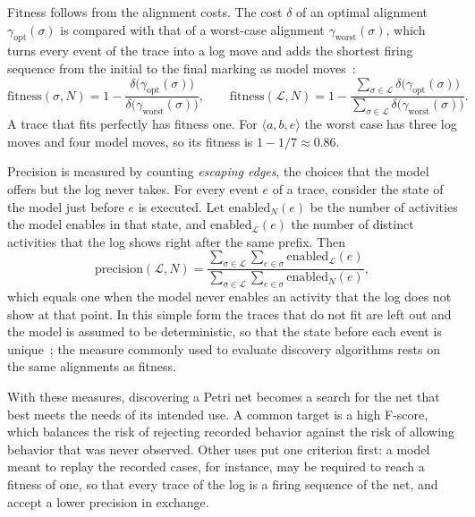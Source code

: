     Fitness follows from the alignment costs. The cost $\delta$ of an optimal
    alignment $\gamma_{\mathrm{opt}}(\sigma)$ is compared with that of a
    worst-case alignment $\gamma_{\mathrm{worst}}(\sigma)$, which turns every event
    of the trace into a log move and adds the shortest firing sequence from the
    initial to the final marking as model moves~\cite{vanderaalst2016}:
    \begin{equation}
    \mathrm{fitness}(\sigma, N) =
    1 - \frac{\delta\bigl(\gamma_{\mathrm{opt}}(\sigma)\bigr)}
             {\delta\bigl(\gamma_{\mathrm{worst}}(\sigma)\bigr)},
    \qquad
    \mathrm{fitness}(\mathcal{L}, N) =
    1 - \frac{\sum_{\sigma \in \mathcal{L}} \delta\bigl(\gamma_{\mathrm{opt}}(\sigma)\bigr)}
             {\sum_{\sigma \in \mathcal{L}} \delta\bigl(\gamma_{\mathrm{worst}}(\sigma)\bigr)}.
    \label{eq:bg:sim:fitness}
    \end{equation}
    A trace that fits perfectly has fitness one. For
    $\langle a, b, e \rangle$ the worst case has three log moves and four model
    moves, so its fitness is $1 - 1/7 \approx 0.86$.
    
    Precision is measured by counting \emph{escaping edges}, the choices that the
    model offers but the log never takes. For every
    event $e$ of a trace, consider the state of the model just before $e$ is
    executed. Let $\mathrm{enabled}_N(e)$ be the number of activities the model
    enables in that state, and $\mathrm{enabled}_{\mathcal{L}}(e)$ the number of
    distinct activities that the log shows right after the same prefix. Then
    \begin{equation}
    \mathrm{precision}(\mathcal{L}, N) =
    \frac{\sum_{\sigma \in \mathcal{L}} \sum_{e \in \sigma} \mathrm{enabled}_{\mathcal{L}}(e)}
         {\sum_{\sigma \in \mathcal{L}} \sum_{e \in \sigma} \mathrm{enabled}_N(e)},
    \label{eq:bg:sim:precision}
    \end{equation}
    which equals one when the model never enables an activity that the log does
    not show at that point. In this simple form the traces that do not fit are
    left out and the model is assumed to be deterministic, so that the state
    before each event is unique~\cite{carmona2022conformance}; the measure
    commonly used to evaluate discovery algorithms rests on the same alignments
    as fitness.

    With these measures, discovering a Petri net becomes a search for the
    net that best meets the needs of its intended use. A common target is a
    high F-score, which balances the risk of rejecting recorded behavior
    against the risk of allowing behavior that was never observed. Other uses
    put one criterion first: a model meant to replay the recorded cases, for
    instance, may be required to reach a fitness of one, so that every trace
    of the log is a firing sequence of the net, and accept a lower precision
    in exchange.

